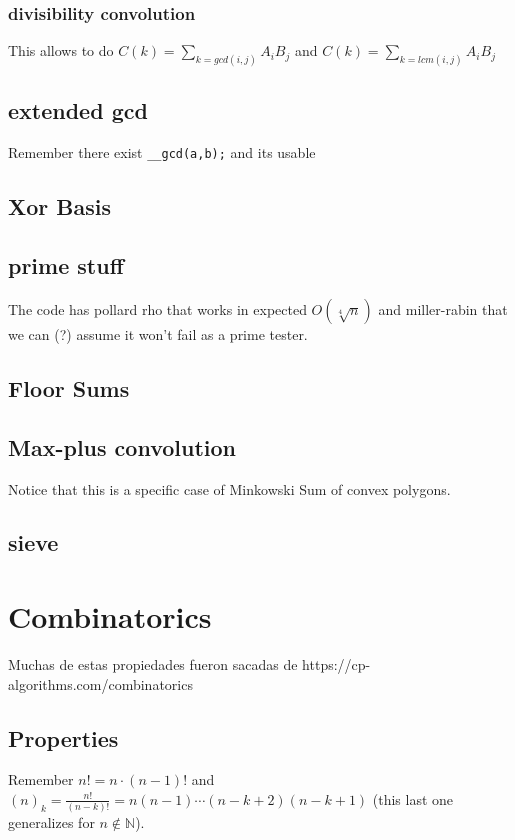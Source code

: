 \documentclass[landscape, 9pt, a4paper, oneside, twocolumn]{extarticle}
\begin{document}
	\subsubsection{divisibility convolution}
	This allows to do $C(k)=\sum_{k=gcd(i,j)}A_iB_j$ and $C(k)=\sum_{k=lcm(i,j)}A_iB_j$
	
	
	\subsection{extended gcd}
	Remember there exist \lstinline|__gcd(a,b);| and its usable
	
	\subsection{Xor Basis}
	
	\subsection{prime stuff}
	The code has pollard rho that works in expected $O(\sqrt[4]{n})$ and miller-rabin that we can (?) assume it won't fail as a prime tester.
	
	
	\subsection{Floor Sums}
	
	\subsection{Max-plus convolution}
	Notice that this is a specific case of Minkowski Sum of convex polygons.
	
	\subsection{sieve}
	
	
\section{Combinatorics}
	Muchas de estas propiedades fueron sacadas de https://cp-algorithms.com/combinatorics
	\subsection{Properties}
	Remember $n!=n\cdot(n-1)!$ and $(n)_k=\frac{n!}{(n-k)!}=n(n-1)\cdots(n-k+2)(n-k+1)$ (this last one generalizes for $n\notin\mathbb{N}$).
\end{document}
